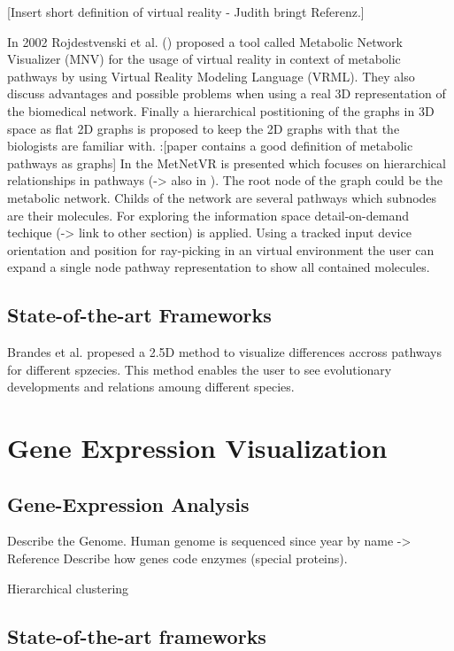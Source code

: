 [Insert short definition of virtual reality - Judith bringt Referenz.]

In 2002 Rojdestvenski et al. (\citep{Rojdestvenski2002, Rojdestvenski2003}) proposed a tool called Metabolic Network Visualizer (MNV) for the usage of virtual reality in context of metabolic pathways by using Virtual Reality Modeling Language (VRML). They also discuss advantages and possible problems when using a real 3D representation of the biomedical network. Finally a hierarchical postitioning of the graphs in 3D space as flat 2D graphs is proposed to keep the 2D graphs with that the biologists are familiar with. 
\citep{Dickerson2003}:[paper contains a good definition of metabolic pathways as graphs]
In \citep{Yang2006} the MetNetVR is presented which focuses on hierarchical relationships in pathways (-> also in \citep{Dogrusoz2004}). The root node of the graph could
be the metabolic network. Childs of the network are several pathways which subnodes are their molecules. For exploring the information space detail-on-demand techique (-> link to other section) is applied. Using a tracked input device orientation and position for  ray-picking in an virtual environment the user can expand a single node pathway representation to show all contained molecules.

\subsection{State-of-the-art Frameworks}

Brandes et al. propesed a 2.5D method to visualize differences accross pathways for different spzecies\citep{Brandes2004}. This method enables the user to see evolutionary developments and relations amoung different species.

\section{Gene Expression Visualization}

\subsection{Gene-Expression Analysis}

Describe the Genome.
Human genome is sequenced since year by name -> Reference 
Describe how genes code enzymes (special proteins).

Hierarchical clustering\citep{Seo2002}

\subsection{State-of-the-art frameworks}

